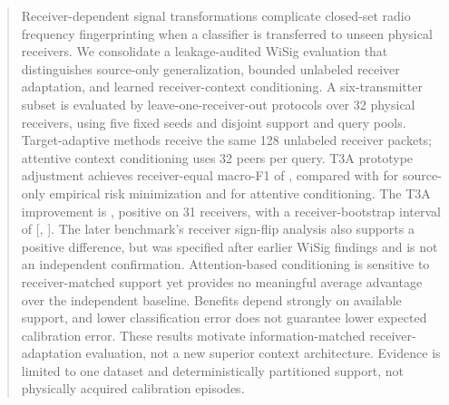 \begin{abstract}
Receiver-dependent signal transformations complicate closed-set radio frequency fingerprinting when a classifier is transferred to unseen physical receivers. We consolidate a leakage-audited WiSig evaluation that distinguishes source-only generalization, bounded unlabeled receiver adaptation, and learned receiver-context conditioning. A six-transmitter subset is evaluated by leave-one-receiver-out protocols over 32 physical receivers, using five fixed seeds and disjoint support and query pools. Target-adaptive methods receive the same 128 unlabeled receiver packets; attentive context conditioning uses 32 peers per query. T3A prototype adjustment achieves receiver-equal macro-F1 of \NTThreeAMacroFOne{}, compared with \NPZeroMacroFOne{} for source-only empirical risk minimization and \NPTwoMacroFOne{} for attentive conditioning. The T3A improvement is \TGain{}, positive on 31 receivers, with a receiver-bootstrap interval of [\TLower{}, \TUpper{}]. The later benchmark's receiver sign-flip analysis also supports a positive difference, but was specified after earlier WiSig findings and is not an independent confirmation. Attention-based conditioning is sensitive to receiver-matched support yet provides no meaningful average advantage over the independent baseline. Benefits depend strongly on available support, and lower classification error does not guarantee lower expected calibration error. These results motivate information-matched receiver-adaptation evaluation, not a new superior context architecture. Evidence is limited to one dataset and deterministically partitioned support, not physically acquired calibration episodes.
\end{abstract}
